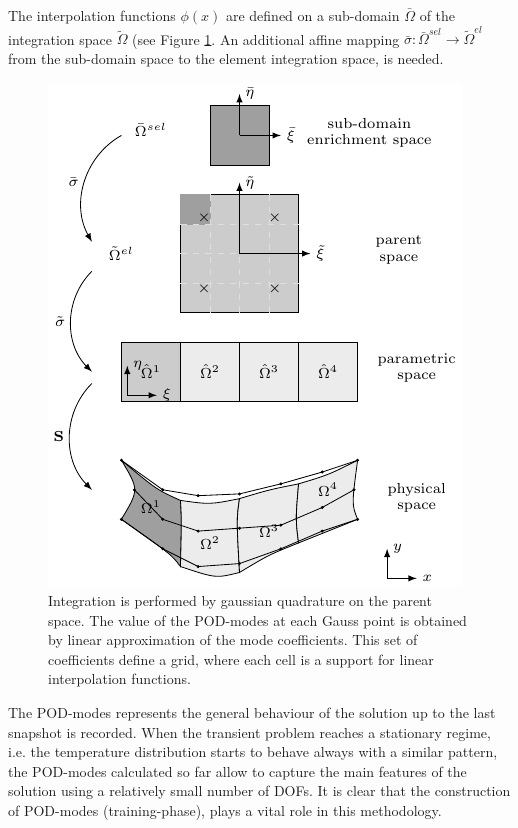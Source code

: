 \documentclass[3p]{article}
\begin{document}
The interpolation functions $\phi(x)$ are defined on a sub-domain $\bar{\Omega}$ of the integration space $\tilde{\Omega}$ (see Figure \ref{fig:IntegrationMappingPODXIgA}. An additional affine mapping $\bar{\sigma}:\bar{\Omega}^{sel}\rightarrow\tilde{\Omega}^{el}$ from the sub-domain space to the element integration space, is needed.
\begin{figure}
\includegraphics[width=1\linewidth]{externals/Pictures/IntegrationXPOD.pdf}
\caption{Integration is performed by gaussian quadrature on the parent space. The value of the POD-modes at each Gauss point is obtained by linear approximation of the mode coefficients. This set of coefficients define a grid, where each cell is a support for linear interpolation functions.}
\label{fig:IntegrationMappingPODXIgA}
\end{figure}
\par 
The POD-modes represents the general behaviour of the solution up to the last snapshot is recorded. When the transient problem reaches a stationary regime, i.e. the temperature distribution starts to behave always with a similar pattern, the POD-modes calculated so far allow to capture the main features of the solution using a relatively small number of DOFs. It is clear that the construction of POD-modes (training-phase), plays a vital role in this methodology.
\end{document}
